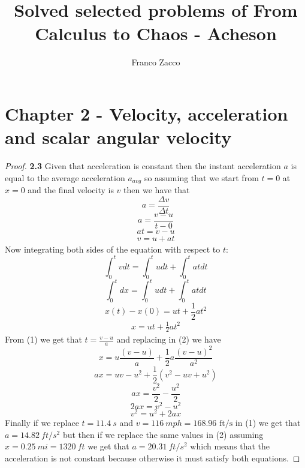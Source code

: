 \documentclass[11pt]{article}
\title{\textbf{Solved selected problems of From Calculus to Chaos - Acheson}}
\author{Franco Zacco}
\date{}
\begin{document}
\maketitle
\thispagestyle{empty}

\section*{Chapter 2 - Velocity, acceleration and scalar angular velocity}

	\begin{proof}{\textbf{2.3}} Given that acceleration is constant then the
        instant acceleration $a$ is equal to the average acceleration $a_{avg}$
        so assuming that we start from $t=0$ at $x=0$ and the final velocity
        is $v$ then we have that
        $$a = \frac{\Delta v}{\Delta t}$$
        $$a = \frac{v - u}{t - 0}$$
        $$at = v - u$$
        \begin{align}
            v = u + at
        \end{align}
        Now integrating both sides of the equation with respect to $t$:
        $$\int_0^t{vdt}=\int_0^t{udt}+\int_0^t{atdt}$$
        $$\int_{0}^t{dx}=\int_0^t{udt}+\int_0^t{atdt}$$
        $$x(t) - x(0) = ut + \frac{1}{2}at^2$$
        \begin{align}
            x = ut + \frac{1}{2}at^2
        \end{align}
        From (1) we get that $t = \frac{v-u}{a}$ and replacing in (2) we have
        $$x = u\frac{(v-u)}{a} + \frac{1}{2}a\frac{(v-u)^2}{a^2}$$
        $$ax = uv - u^2 + \frac{1}{2}(v^2 - uv + u^2)$$
        $$ax = \frac{v^2}{2} - \frac{u^2}{2}$$
        $$2ax = v^2 - u^2$$
        $$v^2 = u^2 + 2ax$$
        Finally if we replace $t=11.4~\si{s}$ and
        $v=116~\si{mph}=168.96\text{ ft/s}$ in (1) we get that
        $a = 14.82~\si{ ft/s^2}$ but then if we replace the same values in (2)
        assuming $x=0.25~\si{mi} =1320~\si{ft}$ we get that
        $a = 20.31~\si{ft/s^2}$ which means that the acceleration is not 
        constant because otherwise it must satisfy both equations.
    \end{proof}
\end{document}
